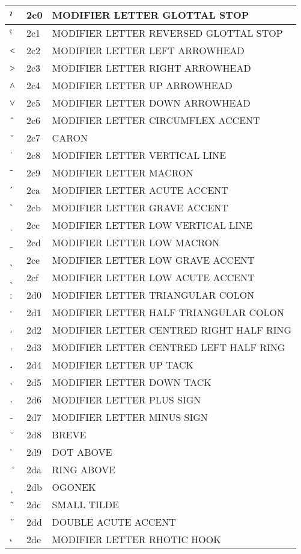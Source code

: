 \documentclass[12pt,letterpaper,openany]{book}
\begin{document}
\begin{center}
\begin{supertabular}{|m{0.25in}|m{0.5in}|m{4in}|}
ˀ & 2c0 & MODIFIER LETTER GLOTTAL STOP\\\hline
ˁ & 2c1 & MODIFIER LETTER REVERSED GLOTTAL STOP\\\hline
˂ & 2c2 & MODIFIER LETTER LEFT ARROWHEAD\\\hline
˃ & 2c3 & MODIFIER LETTER RIGHT ARROWHEAD\\\hline
˄ & 2c4 & MODIFIER LETTER UP ARROWHEAD\\\hline
˅ & 2c5 & MODIFIER LETTER DOWN ARROWHEAD\\\hline
ˆ & 2c6 & MODIFIER LETTER CIRCUMFLEX ACCENT\\\hline
ˇ & 2c7 & CARON\\\hline
ˈ & 2c8 & MODIFIER LETTER VERTICAL LINE\\\hline
ˉ & 2c9 & MODIFIER LETTER MACRON\\\hline
ˊ & 2ca & MODIFIER LETTER ACUTE ACCENT\\\hline
ˋ & 2cb & MODIFIER LETTER GRAVE ACCENT\\\hline
ˌ & 2cc & MODIFIER LETTER LOW VERTICAL LINE\\\hline
ˍ & 2cd & MODIFIER LETTER LOW MACRON\\\hline
ˎ & 2ce & MODIFIER LETTER LOW GRAVE ACCENT\\\hline
ˏ & 2cf & MODIFIER LETTER LOW ACUTE ACCENT\\\hline
ː & 2d0 & MODIFIER LETTER TRIANGULAR COLON\\\hline
ˑ & 2d1 & MODIFIER LETTER HALF TRIANGULAR COLON\\\hline
˒ & 2d2 & MODIFIER LETTER CENTRED RIGHT HALF RING\\\hline
˓ & 2d3 & MODIFIER LETTER CENTRED LEFT HALF RING\\\hline
˔ & 2d4 & MODIFIER LETTER UP TACK\\\hline
˕ & 2d5 & MODIFIER LETTER DOWN TACK\\\hline
˖ & 2d6 & MODIFIER LETTER PLUS SIGN\\\hline
˗ & 2d7 & MODIFIER LETTER MINUS SIGN\\\hline
˘ & 2d8 & BREVE\\\hline
˙ & 2d9 & DOT ABOVE\\\hline
˚ & 2da & RING ABOVE\\\hline
˛ & 2db & OGONEK\\\hline
˜ & 2dc & SMALL TILDE\\\hline
˝ & 2dd & DOUBLE ACUTE ACCENT\\\hline
˞ & 2de & MODIFIER LETTER RHOTIC HOOK\\\hline

\end{supertabular}
\end{center}
\end{document}

